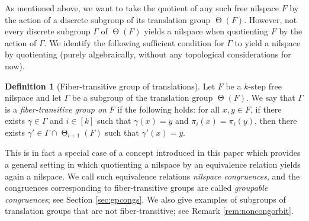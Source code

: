 \documentclass[a4paper,12pt,reqno]{amsart}
\theoremstyle{definition}
\newtheorem{defn}[theorem]{Definition}
\DeclareMathOperator{\tran}{\Theta}
\begin{document}
\noindent As mentioned above, we want to take the quotient of any such free nilspace $F$ by the action of a discrete subgroup of its translation group $\tran(F)$. However, not every discrete subgroup $\Gamma$ of $\tran(F)$ yields a nilspace when quotienting $F$ by the action of $\Gamma$. We identify the following sufficient condition for $\Gamma$ to yield a nilspace by quotienting (purely algebraically, without any topological considerations for now).
\begin{defn}[Fiber-transitive group of translations]
Let $F$ be a $k$-step free nilspace and let $\Gamma$ be a subgroup of the translation group $\tran(F)$. We say that $\Gamma$ is a \emph{fiber-transitive group on} $F$ if the following holds: for all $x,y\in F$, if there exists $\gamma\in \Gamma$ and $i\in[k]$ such that $\gamma(x)=y$ and $\pi_i(x)=\pi_i(y)$, then there exists $\gamma'\in \Gamma\cap \tran_{i+1}(F)$ such that $\gamma'(x)=y$.
\end{defn}
\noindent This is in fact a special case of a concept introduced in this paper which provides a general setting in which quotienting a nilspace by an equivalence relation yields again a nilspace. We call such equivalence relations \emph{nilspace congruences}, and the congruences corresponding to fiber-transitive groups are called \emph{groupable congruences}; see Section \ref{sec:gpcongs}. We also give examples of subgroups of translation groups that are not fiber-transitive; see Remark \ref{rem:noncongorbit}.
\end{document}
